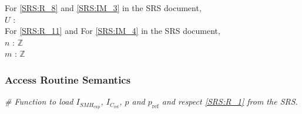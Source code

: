\documentclass[12pt, titlepage]{article}
\begin{document}
\noindent For \cref{SRS:R_8} and \cref{SRS:IM_3} in the SRS document,\\
\noindent$U$ :\\ 

\noindent For \cref{SRS:R_11} and For \cref{SRS:IM_4} in the SRS document,\\
\noindent$n$ : $\mathbb{Z}$\\
$m$ : $\mathbb{Z}$\\
\fi

\subsubsection{Access Routine Semantics}

\noindent\textit{{\#} Function to load $I_{\mathit{SMH}_{\text{exp}}}$, $I_{C_{\text{ref}}}$, $p$ and $p_{\text{ref}}$ and respect \cref{SRS:R_1} from the SRS.}
\medskip
\end{document}
